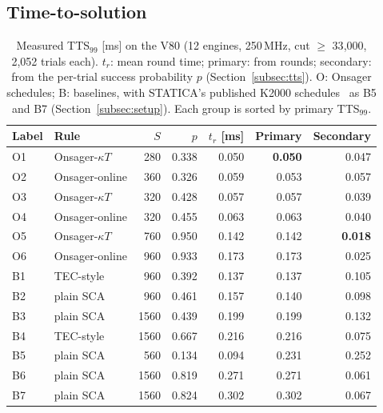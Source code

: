 \subsection{Time-to-solution}\label{subsec:ttsres}
\begin{table}[t]
\centering
\caption{Measured TTS$_{99}$ [ms] on the V80 (12 engines, 250\,MHz, cut $\geq$ 33{,}000, 2{,}052 trials each). $t_r$: mean round time; primary: from rounds; secondary: from the per-trial success probability $p$ (Section~\ref{subsec:tts}). O: Onsager schedules; B: baselines, with STATICA's published K2000 schedules~\cite{yamamoto2021statica} as B5 and B7 (Section~\ref{subsec:setup}). Each group is sorted by primary TTS$_{99}$.}
\label{tab:configs}
\setlength{\tabcolsep}{2.8pt}
\begin{tabular}{@{}llrrrrr@{}}
\toprule
Label & Rule & $S$ & $p$ & $t_r$ [ms] & Primary & Secondary \\
\midrule
O1 & Onsager-$\kappa T$ & 280 & 0.338 & 0.050 & \textbf{0.050} & 0.047 \\
O2 & Onsager-online & 360 & 0.326 & 0.059 & 0.053 & 0.057 \\
O3 & Onsager-$\kappa T$ & 320 & 0.428 & 0.057 & 0.057 & 0.039 \\
O4 & Onsager-online & 320 & 0.455 & 0.063 & 0.063 & 0.040 \\
O5 & Onsager-$\kappa T$ & 760 & 0.950 & 0.142 & 0.142 & \textbf{0.018} \\
O6 & Onsager-online & 960 & 0.933 & 0.173 & 0.173 & 0.025 \\
\midrule
B1 & TEC-style & 960 & 0.392 & 0.137 & 0.137 & 0.105 \\
B2 & plain SCA & 960 & 0.461 & 0.157 & 0.140 & 0.098 \\
B3 & plain SCA & 1560 & 0.439 & 0.199 & 0.199 & 0.132 \\
B4 & TEC-style & 1560 & 0.667 & 0.216 & 0.216 & 0.075 \\
B5 & plain SCA & 560 & 0.134 & 0.094 & 0.231 & 0.252 \\
B6 & plain SCA & 1560 & 0.819 & 0.271 & 0.271 & 0.061 \\
B7 & plain SCA & 1560 & 0.824 & 0.302 & 0.302 & 0.067 \\
\bottomrule
\end{tabular}
\vspace{-0.6em}%
\end{table}
